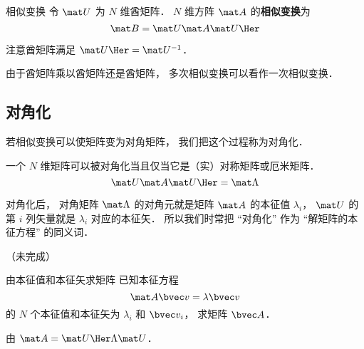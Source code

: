 

\begin{definition}{相似变换}
令 $\mat U$ 为 $N$ 维酋矩阵． $N$ 维方阵 $\mat A$ 的\textbf{相似变换}为
\begin{equation}
\mat B = \mat U \mat A \mat U\Her
\end{equation}
\end{definition}

注意酋矩阵满足 $\mat U\Her = \mat U^{-1}$．

由于酋矩阵乘以酋矩阵还是酋矩阵， 多次相似变换可以看作一次相似变换．

\subsection{对角化}
若相似变换可以使矩阵变为对角矩阵， 我们把这个过程称为对角化．

一个 $N$ 维矩阵可以被对角化当且仅当它是（实）对称矩阵或厄米矩阵．
\begin{equation}\label{MatSim_eq1}
\mat U \mat A \mat U\Her = \mat \Lambda
\end{equation}

对角化后， 对角矩阵 $\mat \Lambda$ 的对角元就是矩阵 $\mat A$ 的本征值 $\lambda_i$， $\mat U$ 的第 $i$ 列矢量就是 $\lambda_i$ 对应的本征矢． 所以我们时常把 “对角化” 作为 “解矩阵的本征方程” 的同义词．

（未完成）

\begin{example}{由本征值和本征矢求矩阵}
已知本征方程
\begin{equation}
\mat A \bvec v = \lambda \bvec v
\end{equation}
的 $N$ 个本征值和本征矢为 $\lambda_i$ 和 $\bvec v_i$， 求矩阵 $\bvec A$．

由 $\mat A = \mat U\Her \Lambda \mat U$．
\end{example}
